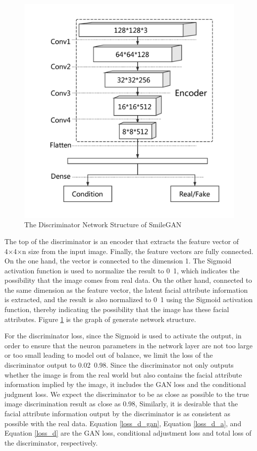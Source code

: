 \begin{figure}
\begin{minipage}[t]{0.48\linewidth}
        \includegraphics[width=\textwidth]{figures/net_discriminator.pdf}
        \caption{The Discriminator Network Structure of SmileGAN}
        \label{net_discriminator}
    \end{minipage}
\end{figure}

The top of the discriminator is an encoder that extracts the feature vector of 4×4×n size from the input image.
Finally, the feature vectors are fully connected.
On the one hand, the vector is connected to the dimension 1.
The Sigmoid activation function is used to normalize the result to 0~1,
    which indicates the possibility that the image comes from real data.
On the other hand, connected to the same dimension as the feature vector,
    the latent facial attribute information is extracted,
    and the result is also normalized to 0~1 using the Sigmoid activation function,
    thereby indicating the possibility that the image has these facial attributes.
Figure \ref{net_discriminator} is the graph of generate network structure.


For the discriminator loss, since the Sigmoid is used to activate the output,
    in order to ensure that the neuron parameters in the network layer are not too large or too small leading to model out of balance,
    we limit the loss of the discriminator output to 0.02~0.98.
Since the discriminator not only outputs whether the image is from the real world but also contains the facial attribute information implied by the image,
    it includes the GAN loss and the conditional judgment loss.
We expect the discriminator to be as close as possible to the true image discrimination result as close as 0.98,
Similarly, it is desirable that the facial attribute information output by the discriminator is as consistent as possible with the real data.
Equation \eqref{loss_d_gan}, Equation \eqref{loss_d_a}, and Equation \eqref{loss_d} are the GAN loss, conditional adjustment loss and total loss of the discriminator, respectively.


